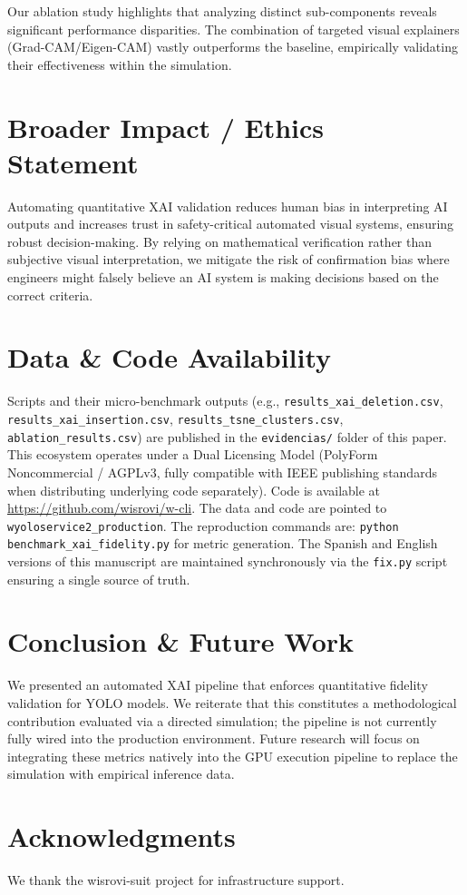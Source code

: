 \documentclass[conference]{IEEEtran}
\begin{document}
Our ablation study highlights that analyzing distinct sub-components reveals significant performance disparities. The combination of targeted visual explainers (Grad-CAM/Eigen-CAM) vastly outperforms the baseline, empirically validating their effectiveness within the simulation.

\section{Broader Impact / Ethics Statement}
Automating quantitative XAI validation reduces human bias in interpreting AI outputs and increases trust in safety-critical automated visual systems, ensuring robust decision-making. By relying on mathematical verification rather than subjective visual interpretation, we mitigate the risk of confirmation bias where engineers might falsely believe an AI system is making decisions based on the correct criteria.

\section{Data \& Code Availability}
Scripts and their micro-benchmark outputs (e.g., \texttt{results\_xai\_deletion.csv}, \texttt{results\_xai\_insertion.csv}, \texttt{results\_tsne\_clusters.csv}, \texttt{ablation\_results.csv}) are published in the \texttt{evidencias/} folder of this paper. This ecosystem operates under a Dual Licensing Model (PolyForm Noncommercial / AGPLv3, fully compatible with IEEE publishing standards when distributing underlying code separately). Code is available at \url{https://github.com/wisrovi/w-cli}. The data and code are pointed to \texttt{wyoloservice2\_production}. The reproduction commands are: \texttt{python benchmark\_xai\_fidelity.py} for metric generation. The Spanish and English versions of this manuscript are maintained synchronously via the \texttt{fix.py} script ensuring a single source of truth.

\section{Conclusion \& Future Work}
We presented an automated XAI pipeline that enforces quantitative fidelity validation for YOLO models. We reiterate that this constitutes a methodological contribution evaluated via a directed simulation; the pipeline is not currently fully wired into the production environment. Future research will focus on integrating these metrics natively into the GPU execution pipeline to replace the simulation with empirical inference data. 

\section*{Acknowledgments}
We thank the wisrovi-suit project for infrastructure support.



\end{document}
